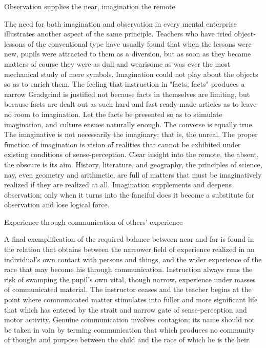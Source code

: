 \documentclass[letterpaper]{book}
\begin{document}
Observation supplies the near, imagination the remote

The need for both imagination and observation in every mental enterprise
illustrates another aspect of the same principle. Teachers who have
tried object-lessons of the conventional type have usually found that
when the lessons were new, pupils were attracted to them as a diversion,
but as soon as they became matters of course they were as dull and
wearisome as was ever the most mechanical study of mere symbols.
Imagination could not play about the objects so as to enrich them. The
feeling that instruction in "facts, facts" produces a narrow Gradgrind
is justified not because facts in themselves are limiting, but because
facts are dealt
out
as such hard and fast ready-made articles as to leave no room to
imagination. Let the facts be presented so as to stimulate imagination,
and culture ensues naturally enough. The converse is equally true. The
imaginative is not necessarily the imaginary; that is, the unreal. The
proper function of imagination is vision of realities that cannot be
exhibited under existing conditions of sense-perception. Clear insight
into the remote, the absent, the obscure is its aim. History,
literature, and geography, the principles of science, nay, even geometry
and arithmetic, are full of matters that must be imaginatively realized
if they are realized at all. Imagination supplements and deepens
observation; only when it turns into the fanciful does it become a
substitute for observation and lose logical force.

Experience through communication of others' experience

A final exemplification of the required balance between near and far is
found in the relation that obtains between the narrower field of
experience realized in an individual's own contact with persons and
things, and the wider experience of the race that may become his through
communication. Instruction always runs the risk of swamping the pupil's
own vital, though narrow, experience under masses of communicated
material. The instructor ceases and the teacher begins at the point
where communicated matter stimulates into fuller and more significant
life that which has entered by the strait and narrow gate of
sense-perception and motor activity. Genuine communication involves
contagion; its name should not be taken in vain by terming communication
that which produces no community of thought and purpose between the
child and the race of which he is the
heir.
\end{document}
